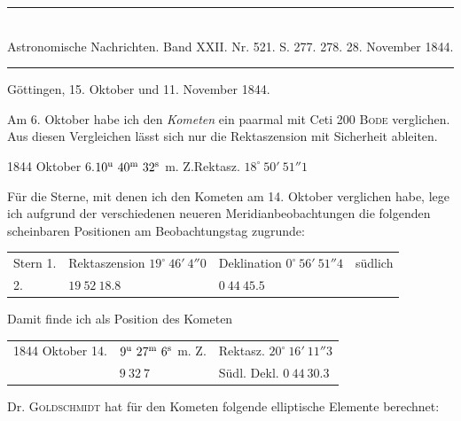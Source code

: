 \clearpage
{}
\hypertarget{native-474-lower}{}
\begin{center}
\rule{0.55\linewidth}{0.4pt}\\[2pt]
Astronomische Nachrichten. Band XXII. Nr. 521. S. 277. 278. 28. November 1844.\\[2pt]
\rule{0.55\linewidth}{0.4pt}
\end{center}
\begin{flushright}Göttingen, 15. Oktober und 11. November 1844.\end{flushright}

Am 6. Oktober habe ich den \emph{Kometen} ein paarmal mit Ceti 200 \textsc{Bode} verglichen. Aus diesen Vergleichen lässt sich nur die Rektaszension mit Sicherheit ableiten.

\begin{center}
1844 Oktober 6.\quad $10^{\rm u}\ 40^{\rm m}\ 32^{\rm s}$ m. Z.\quad Rektasz. $18^\circ\ 50'\ 51''1$
\end{center}

Für die Sterne, mit denen ich den Kometen am 14. Oktober verglichen habe, lege ich aufgrund der verschiedenen neueren Meridianbeobachtungen die folgenden scheinbaren Positionen am Beobachtungstag zugrunde:

\begin{center}
\setlength{\tabcolsep}{3pt}
\begin{tabular}{llll}
Stern 1. & \shortstack[l]{Rektaszension\\$19^\circ\ 46'\ 4''0$} & \shortstack[l]{Deklination\\$0^\circ\ 56'\ 51''4$} & südlich \\
\hfill 2. & \hfill $19\ 52\ 18.8$ & \hfill $0\ 44\ 45.5$ & \\
\end{tabular}
\end{center}
\noindent Damit finde ich als Position des Kometen

\begin{center}
\setlength{\tabcolsep}{3pt}
\begin{tabular}{lll}
1844 Oktober 14. & $9^{\rm u}\ 27^{\rm m}\ 6^{\rm s}$ m. Z. & Rektasz. $20^\circ\ 16'\ 11''3$ \\
 & $9\ 32\ 7$ & Südl. Dekl. $0\ 44\ 30.3$ \\
\end{tabular}
\end{center}

Dr. \textsc{Goldschmidt} hat für den Kometen folgende elliptische Elemente berechnet:

